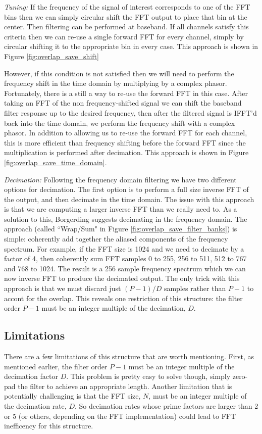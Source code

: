 \documentclass[12pt]{report}
\begin{document}
\emph{Tuning:} If the frequency of the signal of interest corresponds to one of
the FFT bins then we can simply circular shift the FFT output to place that bin
at the center. Then filtering can be performed at baseband.  If all channels
satisfy this criteria then we can re-use a single forward FFT for every
channel, simply by circular shifting it to the appropriate bin in every case. 
This approach is shown in Figure \ref{fig:overlap_save_shift}

However, if this condition is not satisfied then we will need to perform the
frequency shift in the time domain by multiplying by a complex phasor.
Fortunately, there is a still a way to re-use the forward FFT in this case.
After taking an FFT of the non frequency-shifted signal we can shift the
baseband filter response up to the desired frequency, then after the filtered
signal is IFFT'd back into the time domain, we perform the frequency shift with
a complex phasor.  In addition to allowing us to re-use the forward FFT for each channel, this is more efficient than frequency shifting before the
forward FFT since the multiplication is performed after decimation. This
approach is shown in Figure \ref{fig:overlap_save_time_domain}.

\emph{Decimation:} Following the frequency domain filtering we have two
different options for decimation. The first option is to perform a full size
inverse FFT of the output, and then decimate in the time domain. The issue with
this approach is that we are computing a larger inverse FFT than we really need
to. As a solution to this, Borgerding suggests decimating in the frequency
domain. The approach (called ``Wrap/Sum" in Figure
\ref{fig:overlap_save_filter_banks}) is simple: coherently add together the aliased
components of the frequency spectrum.  For example, if the FFT size is 1024 and
we need to decimate by a factor of 4, then coherently sum FFT samples 0 to 255,
256 to 511, 512 to 767 and 768 to 1024.  The result is a 256 sample frequency
spectrum which we can now inverse FFT to produce the decimated output. The only
trick with this approach is that we must discard just $(P-1)/D$ samples rather
than $P-1$ to accont for the overlap.  This reveals one restriction of this
structure: the filter order $P-1$ must be an integer multiple of the
decimation, $D$.

\subsection{Limitations}
\label{sec:os_limitations}
There are a few limitations of this structure that are worth mentioning. First,
as mentioned earlier, the filter order $P-1$ must be an integer multiple of the
decimation factor $D$. This problem is pretty easy to solve though, simply
zero-pad the filter to achieve an appropriate length. Another limitation that
is potentially challenging is that the FFT size, $N$, must be an integer
multiple of the decimation rate, $D$. So decimation rates whose prime factors
are larger than 2 or 5 (or others, depending on the FFT implementation) could
lead to FFT inefficency for this structure.
\end{document}
